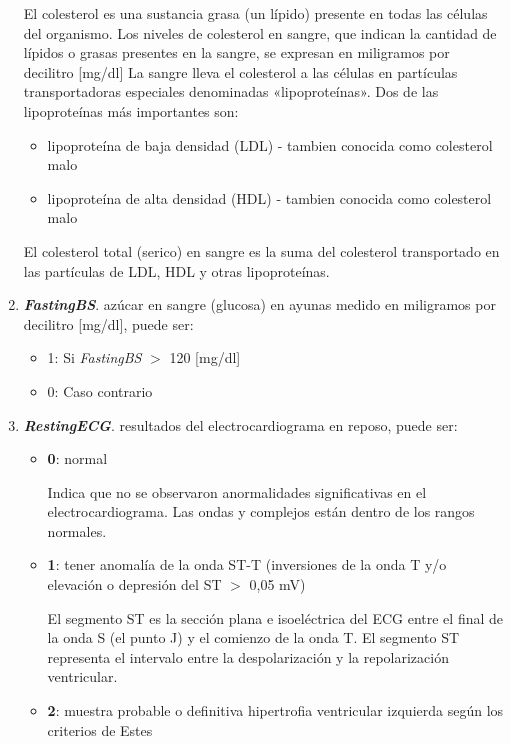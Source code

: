 \documentclass[12pt, letterpaper]{article}
\begin{document}
\begin{enumerate}
{    El colesterol es una sustancia grasa (un lípido) presente en todas las células del organismo.
    Los niveles de colesterol en sangre, que indican la cantidad de lípidos o grasas presentes
    en la sangre, se expresan en miligramos por decilitro [mg/dl]
    La sangre lleva el colesterol a las células en partículas transportadoras especiales 
    denominadas «lipoproteínas». Dos de las lipoproteínas más importantes son:
    \begin{itemize}
        \item{lipoproteína de baja densidad (LDL) - tambien conocida como colesterol malo}
        \item{lipoproteína de alta densidad (HDL) - tambien conocida como colesterol malo}
    \end{itemize}

    El colesterol total (serico) en sangre es la suma del colesterol transportado en las 
    partículas de LDL, HDL y otras lipoproteínas. \cite{colesterol}
    }
    \item{\textbf{\textit{FastingBS}}. azúcar en sangre (glucosa) en ayunas
    medido en miligramos por decilitro [mg/dl], puede ser:
    \begin{itemize}
        \item{1: Si \textit{FastingBS} \(>\) 120 [mg/dl]}
        \item{0: Caso contrario}
    \end{itemize}
    }
    \item{\textbf{\textit{RestingECG}}. resultados del electrocardiograma 
    en reposo, puede ser:
    \begin{itemize}
        \item{\textbf{0}: normal
        
        Indica que no se observaron anormalidades significativas en el electrocardiograma. 
        Las ondas y complejos están dentro de los rangos normales.
        }
        \item{\textbf{1}: tener anomalía de la onda ST-T 
        (inversiones de la onda T y/o elevación o depresión del ST \(>\) 0,05 mV)

        El segmento ST es la sección plana e isoeléctrica 
        del ECG entre el final de la onda S (el punto J) y el comienzo de la onda T.
        El segmento ST representa el intervalo entre la despolarización y la repolarización 
        ventricular. \cite{ST}

        }
        \item{\textbf{2}: muestra probable o definitiva hipertrofia ventricular 
        izquierda según los criterios de Estes
       
}
\end{itemize}}
\end{enumerate}
\end{document}
